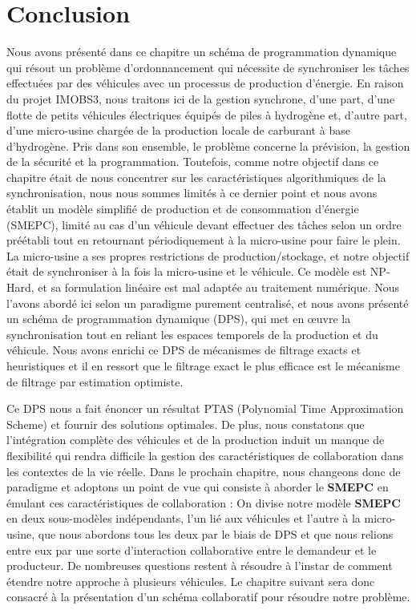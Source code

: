 \section{Conclusion}
Nous avons présenté dans ce chapitre un schéma de programmation dynamique qui résout un problème d'ordonnancement qui nécessite de synchroniser les tâches effectuées par des véhicules avec un processus de production d'énergie. En raison du projet IMOBS3, nous traitons ici de la gestion synchrone, d'une part, d'une flotte de petits véhicules électriques équipés de piles à hydrogène et, d'autre part, d'une micro-usine chargée de la production locale de carburant à base d'hydrogène. Pris dans son ensemble, le problème concerne la prévision, la gestion de la sécurité et la programmation. Toutefois, comme notre objectif dans ce chapitre était de nous concentrer sur les caractéristiques algorithmiques de la synchronisation, nous nous sommes limités à ce dernier point et nous avons établit un modèle simplifié de production et de consommation d'énergie (SMEPC), limité au cas d'un véhicule devant effectuer des tâches selon un ordre préétabli tout en retournant périodiquement à la micro-usine pour faire le plein. La micro-usine a ses propres restrictions de production/stockage, et notre objectif était de synchroniser à la fois la micro-usine et le véhicule. Ce modèle est NP-Hard, et sa formulation linéaire est mal adaptée au traitement numérique. Nous l'avons abordé ici selon un paradigme purement centralisé, et nous avons présenté un schéma de programmation dynamique (DPS), qui met en œuvre la synchronisation tout en reliant les espaces temporels de la production et du véhicule. Nous avons enrichi ce DPS de mécanismes de filtrage exacts et heuristiques et il en ressort que le filtrage exact le plus efficace est le mécanisme de filtrage par estimation optimiste.

Ce DPS nous a fait énoncer un résultat PTAS (Polynomial Time Approximation Scheme) et fournir des solutions optimales. %
  De plus, nous constatons que l'intégration complète des véhicules et de la production induit un manque de flexibilité qui rendra difficile la gestion des caractéristiques de collaboration dans les contextes de la vie réelle. Dans le prochain chapitre, nous changeons donc de paradigme et adoptons un point de vue qui consiste à aborder le \textbf{SMEPC} en émulant ces caractéristiques de collaboration : On divise notre modèle \textbf{SMEPC} en deux sous-modèles indépendants, l'un lié aux véhicules et l'autre à la micro-usine, que nous abordons tous les deux par le biais de DPS et que nous relions entre eux par une sorte d'interaction collaborative entre le demandeur et le producteur. De nombreuses questions restent à résoudre à l'instar de comment étendre notre approche à plusieurs véhicules.
Le chapitre suivant sera donc consacré à la présentation d'un schéma collaboratif pour résoudre notre problème.


